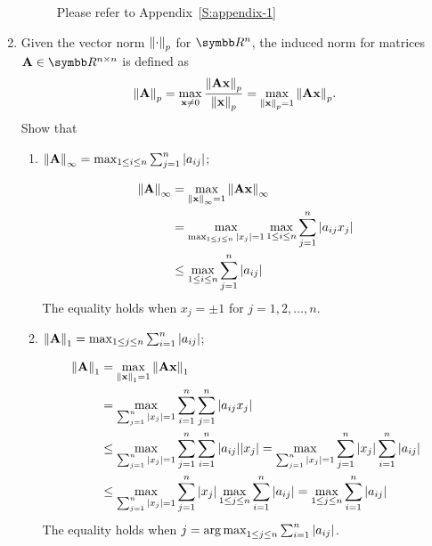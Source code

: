 \begin{enumerate}[label=(\alph*)]
\begin{figure}[H]
            \caption{Please refer to Appendix~\ref{S:appendix-1}}
        \end{figure}
    \item Given the vector norm $\norm{\cdot}_p$ for $\RR^n$, the induced norm for matrices $\mA\in\RR^{n\times n}$ is defined as
        \[
            \norm{\vb{A}}_p = \max_{\vb{x}\neq 0}\frac{\norm{\vb{A}\vb{x}}_p}{\norm{\vb{x}}_p} = \max_{\norm{\vb{x}}_p=1}\norm{\vb{A}\vb{x}}_p.
        \]
        Show that
        \begin{enumerate}[label=\roman*.]
            \item $\norm{\vb{A}}_\infty=\max_{1\leq i\leq n}\sum_{j=1}^n\abs{a_{ij}}$;
                \begin{solution}{}{}
                    \begin{align*}
                        \norm{\vb{A}}_\infty &= \max_{\norm{\vb{x}}_\infty=1}\norm{\vb{A}\vb{x}}_\infty \\
                        &= \max_{\max_{1\leq j\leq n}\abs{x_j}=1}\max_{1\leq i\leq n}\sum_{j=1}^n\abs{a_{ij}x_j} \\
                        &\leq \max_{1\leq i\leq n}\sum_{j=1}^n\abs{a_{ij}} \\
                    \end{align*}
                    The equality holds when $x_j=\pm 1$ for $j=1,2,\ldots,n$.
                \end{solution}
            \item $\norm{\vb{A}}_1=\max_{1\leq j\leq n}\sum_{i=1}^n\abs{a_{ij}}$;
                \begin{solution}{}{}
                    \begin{align*}
                        \norm{\vb{A}}_1 &= \max_{\norm{\vb{x}}_1=1}\norm{\vb{A}\vb{x}}_1 \\
                        &= \max_{\sum_{j=1}^n\abs{x_j}=1}\sum_{i=1}^n\sum_{j=1}^n\abs{a_{ij}x_j} \\
                        &\leq \max_{\sum_{j=1}^n\abs{x_j}=1}\sum_{j=1}^n\sum_{i=1}^n\abs{a_{ij}}\abs{x_j} = \max_{\sum_{j=1}^n\abs{x_j}=1}\sum_{j=1}^n\abs{x_j}\sum_{i=1}^n\abs{a_{ij}} \\
                        &\leq \max_{\sum_{j=1}^n\abs{x_j}=1}\sum_{j=1}^n\abs{x_j}\max_{1\leq j\leq n}\sum_{i=1}^n\abs{a_{ij}} = \max_{1\leq j\leq n}\sum_{i=1}^n\abs{a_{ij}}
                    \end{align*}
                    The equality holds when $j=\operatorname*{arg\,max}_{1\leq j\leq n}\sum_{i=1}^n\abs{a_{ij}}$.
                \end{solution}

\end{enumerate}
\end{enumerate}
